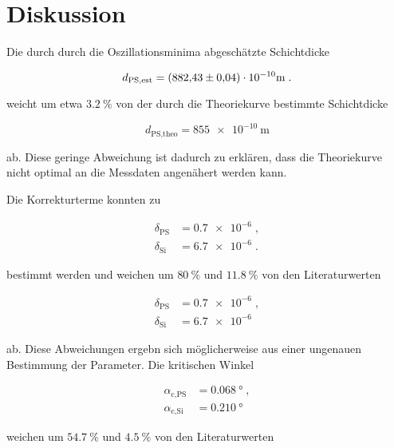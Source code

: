 \section{Diskussion}
\label{sec:Diskussion}

Die durch durch die Oszillationsminima abgeschätzte Schichtdicke

\vspace{-10pt}
\begin{equation*}
    d_\text{PS,est} = (\num{882.43 +- 0.04}) \cdot 10^{-10} \si{\meter} \; .
\end{equation*}

weicht um etwa $\SI{3.2}{\percent}$ von der durch die Theoriekurve bestimmte 
Schichtdicke 

\vspace{-10pt}
\begin{equation*}
    d_\text{PS,theo} = \SI{855e-10}{\meter}
\end{equation*} 

ab. Diese geringe Abweichung ist dadurch zu erklären, dass die Theoriekurve nicht
optimal an die Messdaten angenähert werden kann.

Die Korrekturterme konnten zu 

\vspace{-25pt}
\begin{align*}
    \delta_\text{PS} &= \num{0.7e-6} \; , \\
    \delta_\text{Si} &= \num{6.7e-6} \; .
\end{align*}

bestimmt werden und weichen um $\SI{80}{\percent}$ und 
$\SI{11.8}{\percent}$ von den Literaturwerten \cite{tolan}

\vspace{-15pt}
\begin{align*}
    \delta_\text{PS} &= \num{0.7e-6} \; , \\
    \delta_\text{Si} &= \num{6.7e-6} \;
\end{align*}

ab. Diese Abweichungen ergebn sich möglicherweise aus einer 
ungenauen Bestimmung der Parameter.
Die kritischen Winkel 

\vspace{-20pt}
\begin{align*}
    \alpha_\text{c,PS} &= \SI{0.068}{\degree} \; , \\
    \alpha_\text{c,Si} &= \SI{0.210}{\degree}
\end{align*}
 
weichen um  $\SI{54.7}{\percent}$ und 
$\SI{4.5}{\percent}$ von den Literaturwerten \cite{tolan}

